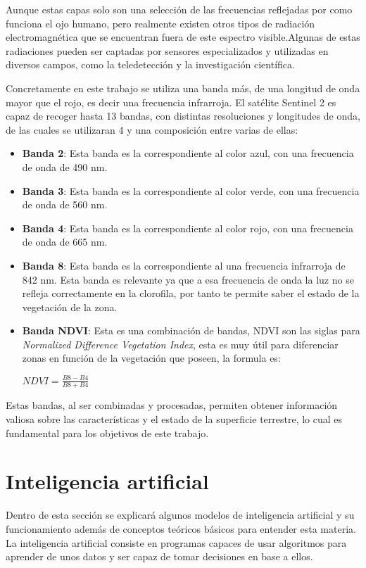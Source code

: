 Aunque estas capas solo son una selección de las frecuencias reflejadas por como funciona el ojo humano, pero realmente existen otros tipos de radiación electromagnética que se encuentran fuera de este espectro visible.Algunas de estas radiaciones pueden ser captadas por sensores especializados y utilizadas en diversos campos, como la teledetección y la investigación científica.

Concretamente en este trabajo se utiliza una banda más, de una longitud de onda mayor que el rojo, es decir una frecuencia infrarroja. El satélite Sentinel 2 es capaz de recoger hasta 13 bandas\cite{gisgeographySentinelBands}, con distintas resoluciones y longitudes de onda, de las cuales se utilizaran 4 y una composición entre varias de ellas:
 \begin{itemize}
	\item\textbf{Banda 2}: Esta banda es la correspondiente al color azul, con una frecuencia de onda de 490 nm.
	
	\item\textbf{Banda 3}: Esta banda es la correspondiente al color verde, con una frecuencia de onda de 560 nm.
	
	\item\textbf{Banda 4}: Esta banda es la correspondiente al color rojo, con una frecuencia de onda de 665 nm.
	
	\item\textbf{Banda 8}: Esta banda es la correspondiente al una frecuencia infrarroja de 842 nm. Esta banda es relevante ya que a esa frecuencia de onda la luz no se refleja correctamente en la clorofila, por tanto te permite saber el estado de la vegetación de la zona.
	
	\item\textbf{Banda NDVI}: Esta es una combinación de bandas, NDVI son las siglas para \textit{Normalized Difference Vegetation Index}, esta es muy útil para diferenciar zonas en función de la vegetación que poseen, la formula es: 
	
	\begin{math}
	NDVI=\frac{B8-B4}{B8+B4}
	\end{math}
	
\end{itemize}

 Estas bandas, al ser combinadas y procesadas, permiten obtener información valiosa sobre las características y el estado de la superficie terrestre, lo cual es fundamental para los objetivos de este trabajo.
 
\section{Inteligencia artificial}
Dentro de esta sección se explicará algunos modelos de inteligencia artificial y su funcionamiento además de conceptos teóricos básicos para entender esta materia.
La inteligencia artificial \cite{rouhiainen2018inteligencia} consiste en programas capaces de usar algoritmos para aprender de unos datos y ser capaz de tomar decisiones en base a ellos.

